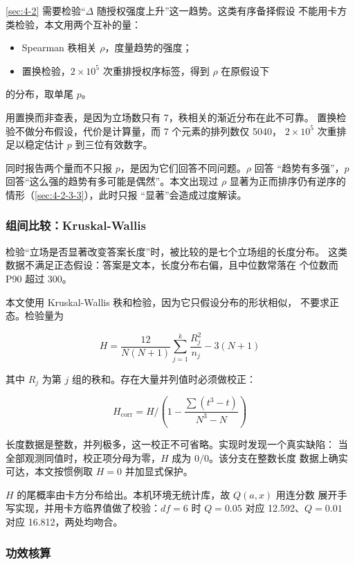 \documentclass[10.5pt,compsoc,UTF8]{CjC}
\theoremstyle{mystyle}
\begin{document}
\ref{sec:4-2} 需要检验“$\Delta$ 随授权强度上升”这一趋势。这类有序备择假设
不能用卡方类检验，本文用两个互补的量：

\begin{itemize}
  \item Spearman 秩相关 $\rho$，度量趋势的强度；
  \item 置换检验，$2\times10^5$ 次重排授权序标签，得到 $\rho$ 在原假设下
\end{itemize}
的分布，取单尾 $p$。

用置换而非查表，是因为立场数只有 7，秩相关的渐近分布在此不可靠。
置换检验不做分布假设，代价是计算量，而 7 个元素的排列数仅 5040，
$2\times10^5$ 次重排足以稳定估计 $p$ 到三位有效数字。

同时报告两个量而不只报 $p$，是因为它们回答不同问题。$\rho$ 回答
“趋势有多强”，$p$ 回答“这么强的趋势有多可能是偶然”。本文出现过
$\rho$ 显著为正而排序仍有逆序的情形（\ref{sec:4-2-3-3}），此时只报
“显著”会造成过度解读。

\subsubsection{组间比较：Kruskal-Wallis}
\label{sec:4-5-3}

检验“立场是否显著改变答案长度”时，被比较的是七个立场组的长度分布。
这类数据不满足正态假设：答案是文本，长度分布右偏，且中位数常落在
个位数而 P90 超过 300。

本文使用 Kruskal-Wallis 秩和检验，因为它只假设分布的形状相似，
不要求正态。检验量为

\begin{equation}
  H = \frac{12}{N(N+1)}\sum_{j=1}^{k} \frac{R_j^2}{n_j} - 3(N+1)
\end{equation}

其中 $R_j$ 为第 $j$ 组的秩和。存在大量并列值时必须做校正：

\begin{equation}
  H_{\text{corr}} = H \Big/ \left(1 - \frac{\sum (t^3 - t)}{N^3 - N}\right)
\end{equation}

长度数据是整数，并列极多，这一校正不可省略。实现时发现一个真实缺陷：
当全部观测同值时，校正项分母为零，$H$ 成为 $0/0$。该分支在整数长度
数据上确实可达，本文按惯例取 $H = 0$ 并加显式保护。

$H$ 的尾概率由卡方分布给出。本机环境无统计库，故 $Q(a,x)$ 用连分数
展开手写实现，并用卡方临界值做了校验：$df=6$ 时 $Q = 0.05$ 对应
12.592、$Q = 0.01$ 对应 16.812，两处均吻合。

\subsubsection{功效核算}
\label{sec:4-5-4}
\end{document}

